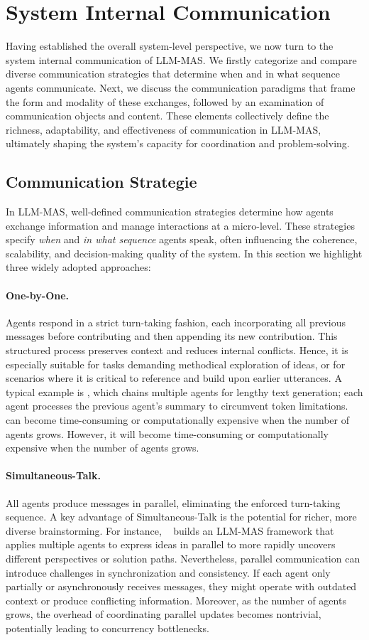 \section{System Internal Communication}
Having established the overall system-level perspective, we now turn to the system internal communication of LLM-MAS. We firstly categorize and compare diverse communication strategies that determine when and in what sequence agents communicate. Next, we discuss the communication paradigms that frame the form and modality of these exchanges, followed by an examination of communication objects and content. These elements collectively define the richness, adaptability, and effectiveness of communication in LLM-MAS, ultimately shaping the system’s capacity for coordination and problem-solving.
\subsection{Communication Strategie}
In LLM-MAS, well-defined communication strategies determine how agents exchange information and manage interactions at a micro-level. These strategies specify \emph{when} and \emph{in what sequence} agents speak, often influencing the coherence, scalability, and decision-making quality of the system. In this section we highlight three widely adopted approaches:

\paragraph{One-by-One.} Agents respond in a strict turn-taking fashion, each incorporating all previous messages before contributing and then appending its new contribution. This structured process preserves context and reduces internal conflicts.  Hence, it is especially suitable for tasks demanding methodical exploration of ideas, or for scenarios where it is critical to reference and build upon earlier utterances. A typical example is \cite{chain_of_agents}, which chains multiple agents for lengthy text generation; each agent processes the previous agent’s summary to circumvent token limitations. can become time-consuming or computationally expensive when the number of agents grows. However, it will become time-consuming or computationally expensive when the number of agents grows.


\paragraph{Simultaneous-Talk.} All agents produce messages in parallel, eliminating the enforced turn-taking sequence. A key advantage of Simultaneous-Talk is the potential for richer, more diverse brainstorming. For instance, ~\cite{autoagents} builds an LLM-MAS framework that applies multiple agents to express ideas in parallel to more rapidly uncovers different perspectives or solution paths. Nevertheless, parallel communication can introduce challenges in synchronization and consistency. If each agent only partially or asynchronously receives messages, they might operate with outdated context or produce conflicting information. Moreover, as the number of agents grows, the overhead of coordinating parallel updates becomes nontrivial, potentially leading to concurrency bottlenecks.

